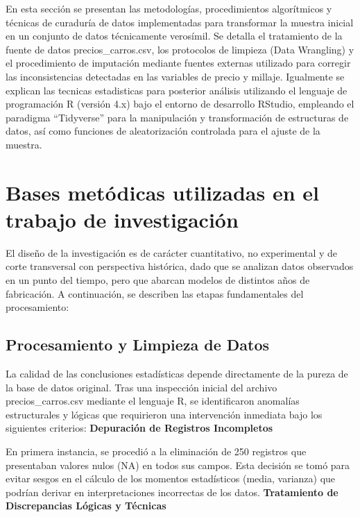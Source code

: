 \documentclass[oneside,11pt]{Latex/Classes/PhDthesisPSnPDF}
\begin{document}
En esta sección se presentan las metodologías, procedimientos
algorítmicos y técnicas de curaduría de datos implementadas para
transformar la muestra inicial en un conjunto de datos técnicamente
verosímil. Se detalla el tratamiento de la fuente de datos
precios\_carros.csv, los protocolos de limpieza (Data Wrangling) y el
procedimiento de imputación mediante fuentes externas utilizado para
corregir las inconsistencias detectadas en las variables de precio y
millaje. \newline \newline Igualmente se explican las tecnicas
estadisticas para posterior análisis utilizando el lenguaje de
programación R (versión 4.x) bajo el entorno de desarrollo RStudio,
empleando el paradigma ``Tidyverse'' para la manipulación y
transformación de estructuras de datos, así como funciones de
aleatorización controlada para el ajuste de la muestra.

\section{Bases metódicas utilizadas en el trabajo de investigación}

El diseño de la investigación es de carácter cuantitativo, no
experimental y de corte transversal con perspectiva histórica, dado que
se analizan datos observados en un punto del tiempo, pero que abarcan
modelos de distintos años de fabricación. A continuación, se describen
las etapas fundamentales del procesamiento:

\subsection{Procesamiento y Limpieza de Datos}

La calidad de las conclusiones estadísticas depende directamente de la
pureza de la base de datos original. Tras una inspección inicial del
archivo precios\_carros.csv mediante el lenguaje R, se identificaron
anomalías estructurales y lógicas que requirieron una intervención
inmediata bajo los siguientes criterios: \newline \newline
\textbf{Depuración de Registros Incompletos}

En primera instancia, se procedió a la eliminación de 250 registros que
presentaban valores nulos (NA) en todos sus campos. Esta decisión se
tomó para evitar sesgos en el cálculo de los momentos estadísticos
(media, varianza) que podrían derivar en interpretaciones incorrectas de
los datos. \newline \newline \textbf{Tratamiento de Discrepancias
Lógicas y Técnicas}
\end{document}
